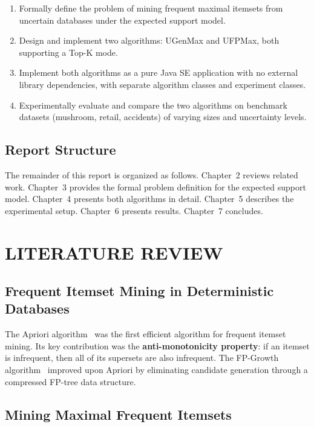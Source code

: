 \documentclass[12pt,a4paper]{report}
\begin{document}
  \begin{enumerate}
    \item Formally define the problem of mining frequent maximal itemsets from uncertain databases under the expected support model.
    \item Design and implement two algorithms: UGenMax and UFPMax, both supporting a Top-K mode.
    \item Implement both algorithms as a pure Java SE application with no external library dependencies, with separate algorithm classes and experiment classes.
    \item Experimentally evaluate and compare the two algorithms on benchmark datasets (mushroom, retail, accidents) of varying sizes and uncertainty levels.
  \end{enumerate}

  \section{Report Structure}

  The remainder of this report is organized as follows. Chapter~2 reviews related work. Chapter~3 provides the formal problem definition for the expected support model. Chapter~4 presents both algorithms in detail. Chapter~5 describes the experimental setup. Chapter~6 presents results. Chapter~7 concludes.

  \chapter{LITERATURE REVIEW}

  \section{Frequent Itemset Mining in Deterministic Databases}

  The Apriori algorithm~\cite{agrawal1994} was the first efficient algorithm for frequent itemset mining. Its key contribution was the \textbf{anti-monotonicity property}: if an itemset is infrequent, then all of its supersets are also infrequent. The FP-Growth algorithm~\cite{han2000} improved upon Apriori by eliminating candidate generation through a compressed FP-tree data structure.

  \section{Mining Maximal Frequent Itemsets}
\end{document}
